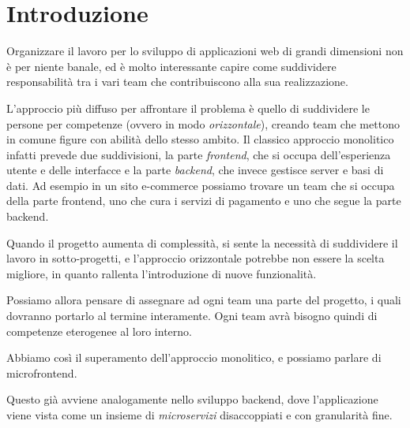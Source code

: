 \chapter{Introduzione}\label{ch:introduzione}
Organizzare il lavoro per lo sviluppo di applicazioni web di grandi dimensioni non è per niente banale, ed è molto interessante
capire come suddividere responsabilità tra i vari team che contribuiscono alla sua realizzazione.

L'approccio più diffuso per affrontare il problema è quello di suddividere le persone per competenze (ovvero in modo \emph{orizzontale}), creando team che mettono in comune
figure con abilità dello stesso ambito. Il classico approccio monolitico infatti prevede due suddivisioni, la parte \emph{frontend}, che si occupa dell'esperienza 
utente e delle interfacce e la parte \emph{backend}, che invece gestisce server e basi di dati.
Ad esempio in un sito e-commerce possiamo trovare un team che si occupa della parte frontend, uno che cura 
i servizi di pagamento e uno che segue la parte backend. 

Quando il progetto aumenta di complessità, si sente la necessità 
di suddividere il lavoro in sotto-progetti, e l'approccio orizzontale potrebbe non essere la scelta migliore,
in quanto rallenta l'introduzione di nuove funzionalità.

Possiamo allora pensare di assegnare ad ogni team una parte del progetto, i quali dovranno portarlo al termine
interamente. Ogni team avrà bisogno quindi di competenze eterogenee al loro interno.

Abbiamo così il superamento dell'approccio monolitico, e possiamo parlare di microfrontend.

Questo già avviene analogamente nello sviluppo backend, dove l'applicazione viene vista come un
insieme di \emph{microservizi} disaccoppiati e con granularità fine.
